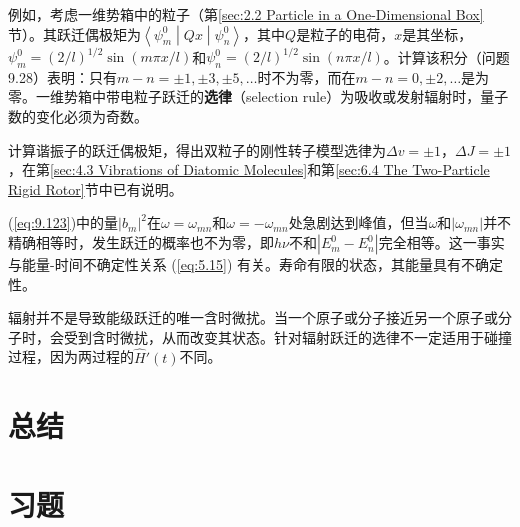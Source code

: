     例如，考虑一维势箱中的粒子（第\ref{sec:2.2 Particle in a One-Dimensional Box}节）。其跃迁偶极矩为$\left\langle \psi_m^0 \middle| Qx \middle| \psi_n^0 \right\rangle$，其中$Q$是粒子的电荷，$x$是其坐标，$\psi_m^0 = \left(2/l\right)^{1/2}\sin\left(m\pi x/l\right)$和$\psi_n^0 = \left(2/l\right)^{1/2}\sin\left(n\pi x/l\right)$。计算该积分（问题9.28）表明：只有$m - n = \pm 1, \pm 3, \pm 5, \ldots$时不为零，而在$m - n = 0, \pm 2,\ldots$是为零。一维势箱中带电粒子跃迁的\textbf{选律}（selection rule）为吸收或发射辐射时，量子数的变化必须为奇数。

    计算谐振子的跃迁偶极矩，得出双粒子的刚性转子模型选律为$\Delta v = \pm 1$，$\Delta J = \pm 1$，在第\ref{sec:4.3 Vibrations of Diatomic Molecules}和第\ref{sec:6.4 The Two-Particle Rigid Rotor}节中已有说明。

    (\ref{eq:9.123})中的量$\left|b_m\right|^2$在$\omega = \omega_{mn}$和$\omega = -\omega_{mn}$处急剧达到峰值，但当$\omega$和$\left| \omega_{mn} \right|$并不精确相等时，发生跃迁的概率也不为零，即$h\nu$不和$\left|E_m^0 - E_n^0\right|$完全相等。这一事实与能量-时间不确定性关系 (\ref{eq:5.15}) 有关。寿命有限的状态，其能量具有不确定性。

    辐射并不是导致能级跃迁的唯一含时微扰。当一个原子或分子接近另一个原子或分子时，会受到含时微扰，从而改变其状态。针对辐射跃迁的选律不一定适用于碰撞过程，因为两过程的$\hat{H}'\left(t\right)$不同。



\section*{总结}

\section*{习题}